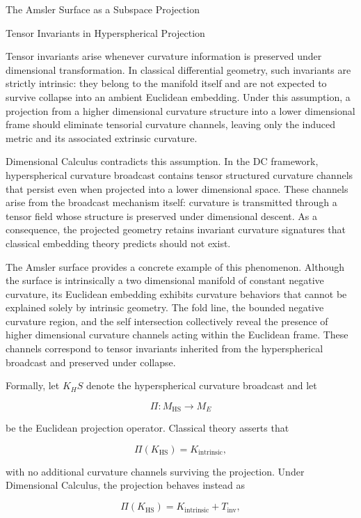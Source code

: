 \documentclass[final,onefignum,onetabnum]{siamart}
\begin{document}
\begin{section}{The Amsler Surface as a Subspace Projection}
\begin{subsection}{Tensor Invariants in Hyperspherical Projection}

Tensor invariants arise whenever curvature information is preserved under dimensional transformation. In classical differential geometry, such invariants are strictly intrinsic: they belong to the manifold itself and are not expected to survive collapse into an ambient Euclidean embedding. Under this assumption, a projection from a higher dimensional curvature structure into a lower dimensional frame should eliminate tensorial curvature channels, leaving only the induced metric and its associated extrinsic curvature.

Dimensional Calculus contradicts this assumption. In the DC framework, hyperspherical curvature broadcast contains tensor structured curvature channels that persist even when projected into a lower dimensional space. These channels arise from the broadcast mechanism itself: curvature is transmitted through a tensor field whose structure is preserved under dimensional descent. As a consequence, the projected geometry retains invariant curvature signatures that classical embedding theory predicts should not exist.

The Amsler surface provides a concrete example of this phenomenon. Although the surface is intrinsically a two dimensional manifold of constant negative curvature, its Euclidean embedding exhibits curvature behaviors that cannot be explained solely by intrinsic geometry. The fold line, the bounded negative curvature region, and the self intersection collectively reveal the presence of higher dimensional curvature channels acting within the Euclidean frame. These channels correspond to tensor invariants inherited from the hyperspherical broadcast and preserved under collapse.

Formally, let $K_HS$ denote the hyperspherical curvature broadcast and let


\[
\Pi : M_{\mathrm{HS}} \longrightarrow M_{E}
\]


be the Euclidean projection operator. Classical theory asserts that


\[
\Pi\!\left( K_{\mathrm{HS}} \right) = K_{\mathrm{intrinsic}},
\]


with no additional curvature channels surviving the projection. Under Dimensional Calculus, the projection behaves instead as


\[
\Pi\!\left( K_{\mathrm{HS}} \right) = K_{\mathrm{intrinsic}} + T_{\mathrm{inv}},
\]



\end{subsection}
\end{section}
\end{document}
